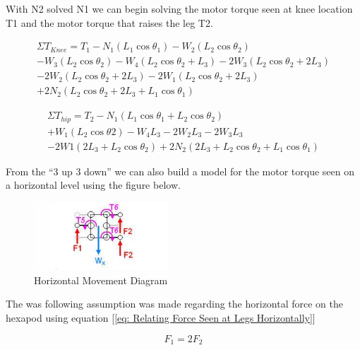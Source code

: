 With N2 solved N1 we can begin solving the motor torque seen at knee location T1 and the motor torque that raises the leg T2.


\begin{multline} \label{eq: Motor Reaction Torque at Knee}
\Sigma T_{Knee} =  T_1 - N_1(L_1 \cos \theta_1) - W_2 (L_2 \cos \theta_2)\\ - W_3 (L_2 \cos \theta_2) - W_4 (L_2 \cos \theta_2 + L_3) -2W_3 (L_2 \cos \theta_2 + 2L_3)\\ - 2W_2 (L_2 \cos \theta_2 + 2L_3) - 2W_1(L_2 \cos \theta_2 + 2L_3)\\ + 2N_2(L_2 \cos \theta_2 + 2L_3 + L_1 \cos \theta_1)
\end{multline}



\begin{multline} \label{eq: Solving For Motor Reaction Torque at Leg}
	\Sigma T_{hip} = T_2 - N_1 (L_1 \cos \theta_1 + L_2 \cos \theta_2)\\ +
	W_1 (L_2 \cos \theta2) -W_4 L_3 -2W_2 L_3 - 2W_3 L_3\\ - 2W1 (2L_3 + L_2 \cos \theta_2)  + 	2N_2 (2L_3 + L_2 \cos \theta_2 + L_1 \cos \theta_1 )
\end{multline} 



From the “3 up 3 down” we can also build a model for the motor torque seen on a horizontal level using the figure below.


\begin{figure}[h]
 \centering
   \includegraphics[width = 0.45\textwidth]{figures/2.png}                            
   \caption{Horizontal Movement Diagram}
   \label{fig: Diagram 4}
\end{figure}



The was following assumption was made regarding the horizontal force on the hexapod using equation [\ref{eq: Relating Force Seen at Legs Horizontally}]

\begin{equation} \label{eq: Relating Force Seen at Legs Horizontally}
	F_1 = 2F_2
\end{equation}



